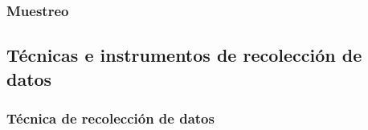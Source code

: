 \documentclass[12pt,a4paper]{article}
\begin{document}
\subsubsection{Muestreo}

%


\subsection{Técnicas e instrumentos de recolección de datos}

\subsubsection{Técnica de recolección de datos}
\end{document}
